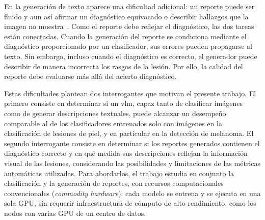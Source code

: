 En la generación de texto aparece una dificultad adicional: un reporte puede ser fluido y aun así afirmar un
diagnóstico equivocado o describir hallazgos que la imagen no muestra~\cite{bai2024hallucination}. Como el
reporte debe reflejar el diagnóstico, las dos tareas están conectadas. Cuando la generación del reporte se condiciona mediante el diagnóstico proporcionado por un clasificador, sus errores pueden propagarse al texto. Sin embargo, incluso cuando el diagnóstico es correcto, el generador puede describir de manera incorrecta los rasgos de la lesión. Por ello, la calidad del reporte debe evaluarse más allá del acierto diagnóstico.

Estas dificultades plantean dos interrogantes que motivan el presente trabajo. El primero consiste en determinar si un
\gls{vlm}, capaz tanto de clasificar imágenes como de generar descripciones textuales, puede alcanzar un desempeño
comparable al de los clasificadores entrenados solo con imágenes en la clasificación de lesiones de piel, y en
particular en la detección de melanoma. El segundo interrogante consiste en determinar si los reportes generados contienen el diagnóstico correcto y en qué medida sus descripciones reflejan la información visual de las lesiones, considerando las posibilidades y limitaciones de las métricas automáticas utilizadas. Para abordarlos, el trabajo estudia en conjunto la clasificación y la generación de reportes, con
recursos computacionales convencionales (\emph{commodity hardware}): cada modelo se entrena y se ejecuta en una
sola GPU, sin requerir infraestructura de cómputo de alto rendimiento, como los nodos con varias GPU de un
centro de datos.

